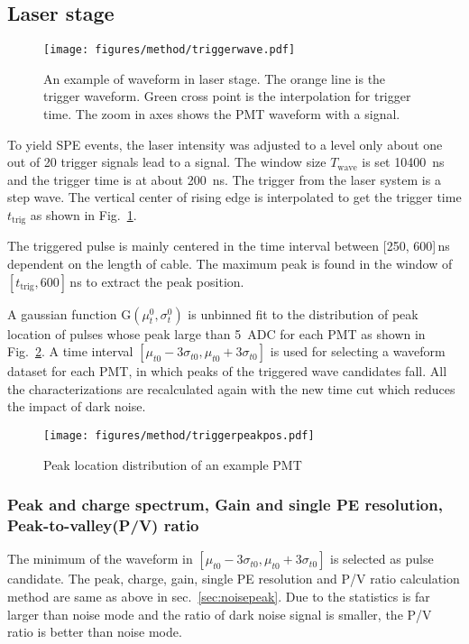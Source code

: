 \subsection{Laser stage}
\label{sec:laserstage}

\begin{figure}[!htbp]
    \centering
    \texttt{[image: figures/method/triggerwave.pdf]}
    \caption{An example of waveform in laser stage. The orange line is the trigger waveform. Green cross point is the interpolation for trigger time. The zoom in axes shows the PMT waveform with a signal.}
    \label{fig:triggertime}
\end{figure}

To yield SPE events, the laser intensity was adjusted to a level only about one out of 20 trigger signals lead to a signal. The window size $T_{\mathrm{wave}}$ is set \SI{10400}{ns} and the trigger time is at about \SI{200}{ns}. The trigger from the laser system is a step wave. The vertical center of rising edge is interpolated to get the trigger time $t_{\mathrm{trig}}$ as shown in Fig.~\ref{fig:triggertime}.

The triggered pulse is mainly centered in the time interval between [250, 600]\,ns dependent on the length of cable. The maximum peak is found in the window of $[t_{\mathrm{trig}}, 600]$\,ns to extract the peak position.

A gaussian function G$(\mu_t^0,\sigma_t^0)$ is unbinned fit to the distribution of peak location of pulses whose peak large than \SI{5}{ADC} for each PMT as shown in Fig.~\ref{fig:peaklocation}. A time interval $[\mu_{t0}-3\sigma_{t0}, \mu_{t0}+3\sigma_{t0}]$ is used for selecting a waveform dataset for each PMT, in which peaks of the triggered wave candidates fall. All the characterizations are recalculated again with the new time cut which reduces the impact of dark noise.

\begin{figure}[!htbp]
    \centering
    \texttt{[image: figures/method/triggerpeakpos.pdf]}
    \caption{Peak location distribution of an example PMT}%
    \label{fig:peaklocation}
\end{figure}

\subsubsection{Peak and charge spectrum, Gain and single PE resolution, Peak-to-valley(P/V) ratio}
\label{sec:triggerpeak}
The minimum of the waveform in $[\mu_{t0}-3\sigma_{t0}, \mu_{t0}+3\sigma_{t0}]$ is selected as pulse candidate. The peak, charge, gain, single PE resolution and P/V ratio calculation method are same as above in sec.~\ref{sec:noisepeak}. Due to the statistics is far larger than noise mode and the ratio of dark noise signal is smaller, the P/V ratio is better than noise mode.


